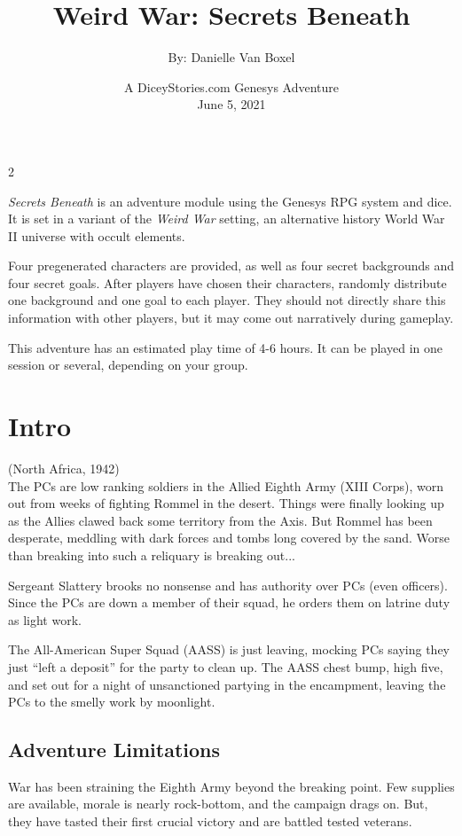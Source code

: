 \documentclass{book}
\title{Weird War: Secrets Beneath}
\author{By: Danielle Van Boxel}
\date{A DiceyStories.com Genesys Adventure\\
      June 5, 2021}
\newcommand{\gb}{\emph{Secrets Beneath} }
\begin{document}
\maketitle

\begin{multicols}{2}

\gb is an adventure module using the Genesys RPG system and dice.  It is set in a variant of the \emph{Weird War} setting, an alternative history World War II universe with occult elements.

Four pregenerated characters are provided, as well as four secret backgrounds and four secret goals.  After players have chosen their characters, randomly distribute one background and one goal to each player.  They should not directly share this information with other players, but it may come out narratively during gameplay.

This adventure has an estimated play time of 4-6 hours.  It can be played in one session or several, depending on your group.

\section{Intro}
(North Africa, 1942)\\

    The PCs are low ranking soldiers in the Allied Eighth Army (XIII Corps), worn out from weeks of fighting Rommel in the desert.  Things were finally looking up as the Allies clawed back some territory from the Axis.  But Rommel has been desperate, meddling with dark forces and tombs long covered by the sand.  Worse than breaking into such a reliquary is breaking out...

    Sergeant Slattery brooks no nonsense and has authority over PCs (even officers).  Since the PCs are down a member of their squad, he orders them on latrine duty as light work.

    The All-American Super Squad (AASS) is just leaving, mocking PCs saying they just ``left a deposit'' for the party to clean up.  The AASS chest bump, high five, and set out for a night of unsanctioned partying in the encampment, leaving the PCs to the smelly work by moonlight.

\subsection{Adventure Limitations}

    War has been straining the Eighth Army beyond the breaking point.  Few supplies are available, morale is nearly rock-bottom, and the campaign drags on.  But, they have tasted their first crucial victory and are battled tested veterans.
    

\end{multicols}
\end{document}
